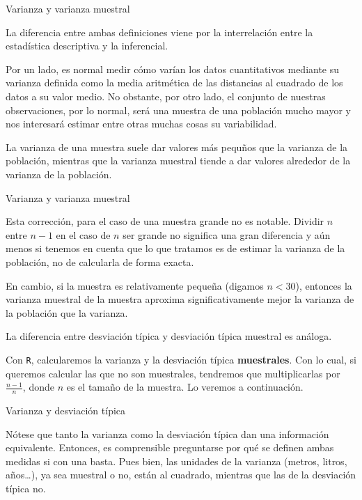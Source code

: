 \documentclass[
  ignorenonframetext,
]{beamer}
\begin{document}
\begin{frame}{Varianza y varianza muestral}
\protect\hypertarget{varianza-y-varianza-muestral}{}

La diferencia entre ambas definiciones viene por la interrelación entre
la estadística descriptiva y la inferencial.

Por un lado, es normal medir cómo varían los datos cuantitativos
mediante su varianza definida como la media aritmética de las distancias
al cuadrado de los datos a su valor medio. No obstante, por otro lado,
el conjunto de nuestras observaciones, por lo normal, será una muestra
de una población mucho mayor y nos interesará estimar entre otras muchas
cosas su variabilidad.

La varianza de una muestra suele dar valores más pequños que la varianza
de la población, mientras que la varianza muestral tiende a dar valores
alrededor de la varianza de la población.

\end{frame}

\begin{frame}[fragile]{Varianza y varianza muestral}
\protect\hypertarget{varianza-y-varianza-muestral-1}{}

Esta corrección, para el caso de una muestra grande no es notable.
Dividir \(n\) entre \(n-1\) en el caso de \(n\) ser grande no significa
una gran diferencia y aún menos si tenemos en cuenta que lo que tratamos
es de estimar la varianza de la población, no de calcularla de forma
exacta.

En cambio, si la muestra es relativamente pequeña (digamos \(n<30\)),
entonces la varianza muestral de la muestra aproxima significativamente
mejor la varianza de la población que la varianza.

La diferencia entre desviación típica y desviación típica muestral es
análoga.

Con \texttt{R}, calcularemos la varianza y la desviación típica
\textbf{muestrales}. Con lo cual, si queremos calcular las que no son
muestrales, tendremos que multiplicarlas por \(\frac{n-1}{n}\), donde
\(n\) es el tamaño de la muestra. Lo veremos a continuación.

\end{frame}

\begin{frame}{Varianza y desviación típica}
\protect\hypertarget{varianza-y-desviaciuxf3n-tuxedpica}{}

Nótese que tanto la varianza como la desviación típica dan una
información equivalente. Entonces, es comprensible preguntarse por qué
se definen ambas medidas si con una basta. Pues bien, las unidades de la
varianza (metros, litros, años\ldots), ya sea muestral o no, están al
cuadrado, mientras que las de la desviación típica no.

\end{frame}
\end{document}
